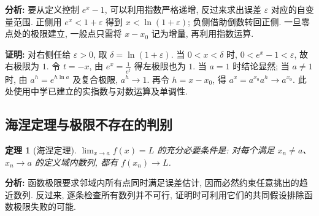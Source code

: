 \documentclass[UTF8,openany]{ctexbook}
\theoremstyle{chinesetextbook}
\newtheorem{theorem}{定理}[section]
\newenvironment{cnproof}{\par\indent\textbf{证明:} \ignorespaces}{\par}
\begin{document}
\par\indent\textbf{分析:} 要从定义控制 $e^x-1$, 可以利用指数严格递增, 反过来求出误差 $\varepsilon$ 对应的自变量范围. 正侧用 $e^x<1+\varepsilon$ 得到 $x<\ln(1+\varepsilon)$; 负侧借助倒数转回正侧. 一旦零点处的极限建立, 一般点只需将 $x-x_0$ 记为增量, 再利用指数运算.
\begin{cnproof}
对右侧任给 $\varepsilon>0$, 取 $\delta=\ln(1+\varepsilon)$. 当 $0<x<\delta$ 时, $0<e^x-1<\varepsilon$, 故右极限为 $1$. 令 $t=-x$, 由 $\displaystyle e^x=\frac1{e^t}$ 得左极限也为 $1$. 当 $a=1$ 时结论显然; 当 $a\ne1$ 时, 由 $a^h=e^{h\ln a}$ 及复合极限, $a^h\to1$. 再令 $h=x-x_0$, 得 $a^x=a^{x_0}a^h\to a^{x_0}$. 此处使用中学已建立的实指数与对数运算及单调性.
\end{cnproof}
\subsection{海涅定理与极限不存在的判别}
\begin{theorem}[海涅定理]
$\displaystyle \lim_{x\to a}f(x)=L$ 的充分必要条件是: 对每个满足 $x_n\ne a$、$x_n\to a$ 的定义域内数列, 都有 $f(x_n)\to L$.
\end{theorem}
\par\indent\textbf{分析:} 函数极限要求邻域内所有点同时满足误差估计, 因而必然约束任意挑出的趋近数列. 反过来, 逐条检查所有数列并不可行, 证明时可利用它们的共同假设排除函数极限失败的可能.
\end{document}
